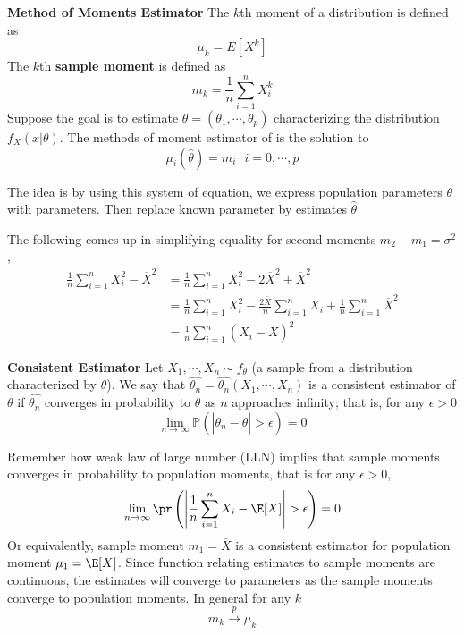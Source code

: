 \documentclass[11pt]{article}
\begin{document}
\begin{defn*}
  \textbf{Method of Moments Estimator} The $k$th moment of a distribution is defined as
  \[
    \mu_k = E[X^k]
  \]
  The $k$th \textbf{sample moment} is defined as
  \[
    m_k = \frac{1}{n}\sum_{i=1}^n X_i^k
  \]
  Suppose the goal is to estimate $\theta = (\theta_1, \cdots, \theta_p)$ characterizing the distribution $f_X(x|\theta)$. The methods of moment estimator of  is the solution to
  \[
    \mu_{i}(\hat{\theta}) = m_i \text{    } i=0,\cdots, p
  \]
  \begin{rem}
    The idea is by using this system of equation, we express population parameters $\theta$ with parameters. Then replace known parameter by estimates $\hat{\theta}$
  \end{rem}
  The following comes up in simplifying equality for second moments $m_2 -m_1 = \sigma^2$,
  \begin{align*}
    \frac{1}{n}\sum_{i=1}^n  X_i^2 - \overline{X}^2 &= \frac{1}{n}\sum_{i=1}^n  X_i^2 - 2\overline{X}^2 + \overline{X}^2 \\
    &= \frac{1}{n}\sum_{i=1}^n  X_i^2 - \frac{2\overline{X}}{n}\sum_{i=1}^n X_i  + \frac{1}{n}\sum_{i=1}^n \overline{X}^2 \\
    &= \frac{1}{n} \sum_{i=1}^n (X_i - \overline{X})^2 \tag{looks similar to $S^2$}
  \end{align*}
\end{defn*}



\begin{defn*}
  \textbf{Consistent Estimator} Let $X_1, \cdots, X_n \sim f_{\theta}$ (a sample from a distribution characterized by $\theta$). We say that $\hat{\theta_n} = \hat{\theta_n}(X_1, \cdots, X_n)$ is a consistent estimator of $\theta$ if $\hat{\theta_n}$ converges in probability to $\theta$ as $n$ approaches infinity; that is, for any $\epsilon >0$
  \[
    \lim_{n\to\infty} \mathbb{P}\left(\left|\hat{\theta_n} - \theta \right| > \epsilon \right) = 0
  \]
  \begin{rem}
    Remember how weak law of large number (LLN) implies that sample moments converges in probability to population moments, that is for any $\epsilon > 0$,
    \[
      \lim_{n\to\infty} \pr \left(\left| \frac{1}{n} \sum_{i=1}^n X_i - \E[X] \right| > \epsilon \right) = 0
    \]
    Or equivalently, sample moment $m_1 = \overline{X}$ is a consistent estimator for population moment $\mu_1 = \E[X]$. Since function relating estimates to sample moments are continuous, the estimates will converge to parameters as the sample moments converge to population moments. In general for any $k$
    \[
      m_k \stackrel{p}{\to} \mu_k
    \]
  \end{rem}

\end{defn*}
\end{document}

